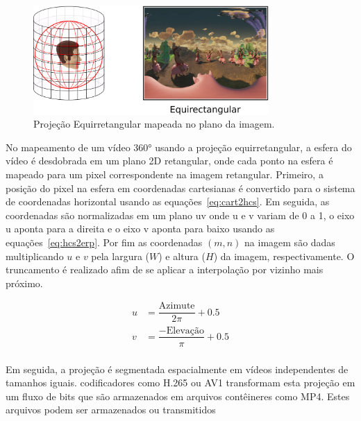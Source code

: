 {\begin{figure}
	\centering
	\includegraphics[width=0.8\textwidth]{fig/erp.png}
	\caption{Projeção Equirretangular mapeada no plano da imagem.}
	\label{fig:erp}
\end{figure}

No mapeamento de um vídeo 360° usando a projeção equirretangular, a esfera do vídeo é desdobrada em um plano 2D retangular, onde cada ponto na esfera é mapeado para um pixel correspondente na imagem retangular. Primeiro, a posição do pixel na esfera em coordenadas cartesianas é convertido para o sistema de coordenadas horizontal usando as equações~\ref{eq:cart2hcs}. Em seguida, as coordenadas são normalizadas em um plano uv onde u e v variam de 0 a 1, o eixo u aponta para a direita e o eixo v aponta para baixo usando as equações~\ref{eq:hcs2erp}. Por fim as coordenadas $(m, n)$ na imagem são dadas multiplicando $u$ e $v$ pela largura ($W$) e altura ($H$) da  imagem, respectivamente. O truncamento é realizado afim de se aplicar a interpolação por vizinho mais próximo.

\begin{align}
	u &= \dfrac{\text{Azimute}}{2\pi} + 0.5 \\
	v &= \dfrac{-\text{Elevação}}{\pi} + 0.5 \\
	\label{eq:hcs2erp}
\end{align}


Em seguida, a projeção é segmentada espacialmente em vídeos independentes de tamanhos iguais.
codificadores como H.265 ou AV1 transformam esta projeção em um fluxo de bits que são armazenados em arquivos contêineres como MP4. Estes arquivos podem ser armazenados ou transmitidos


}
